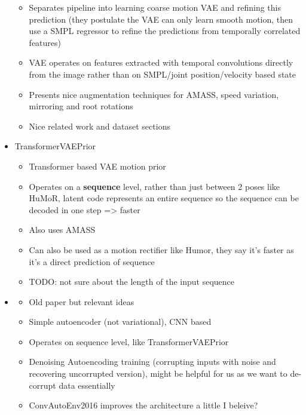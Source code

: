 \begin{itemize}
\begin{itemize}
        \item Separates pipeline into learning coarse motion VAE and refining this prediction (they postulate the VAE can only learn smooth motion, then use a SMPL regressor to refine the predictions from temporally correlated features)
        \item VAE operates on features extracted with temporal convolutions directly from the image rather than on SMPL/joint position/velocity based state
        \item Presents nice augmentation techniques for AMASS, speed variation, mirroring and root rotations
        \item Nice related work and dataset sections
    \end{itemize}
    \item TransformerVAEPrior \cite{TransformerVAEPrior}
    \begin{itemize}
        \item Transformer based VAE motion prior
        \item Operates on a \textbf{sequence} level, rather than just between 2 poses like HuMoR, latent code represents an entire sequence so the sequence can be decoded in one step => faster
        \item Also uses AMASS
        \item Can also be used as a motion rectifier like Humor, they say it's faster as it's a direct prediction of sequence
        \item TODO: not sure about the length of the input sequence
    \end{itemize}
    \item \cite{ConvAutoEnv2015}
    \begin{itemize}
        \item Old paper but relevant ideas
        \item Simple autoencoder (not variational), CNN based
        \item Operates on sequence level, like TransformerVAEPrior
        \item Denoising Autoencoding training (corrupting inputs with noise and recovering uncorrupted version), might be helpful for us as we want to de-corrupt data essentially
        \item ConvAutoEnv2016 \cite{ConvAutoEnv2016} improves the architecture a little I beleive?
    \end{itemize}


\end{itemize}
